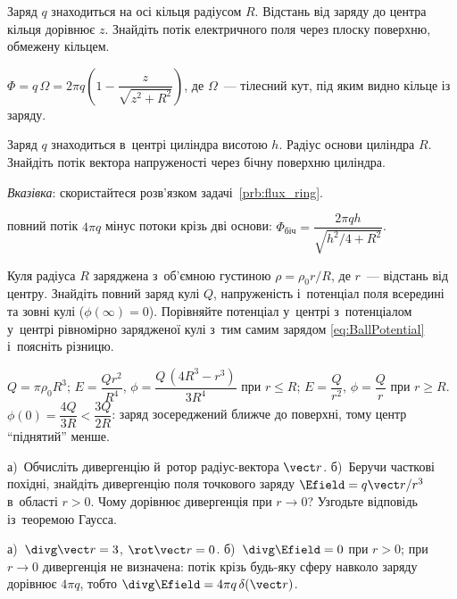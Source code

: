 
\begin{problem}\label{prb:flux_ring}%
	Заряд $q$ знаходиться на осі кільця радіусом $R$. Відстань від заряду до центра кільця
	дорівнює $z$. Знайдіть потік електричного поля через плоску поверхню, обмежену кільцем.
	\begin{solution}
		$\Phi=q\,\Omega=2\pi q\left(1-\dfrac{z}{\sqrt{z^2+R^2}}\right)$, де $\Omega$~--- тілесний кут, під яким видно кільце із заряду.
	\end{solution}
\end{problem}

\begin{problem}%
	Заряд $q$ знаходиться в~центрі циліндра висотою $h$. Радіус основи циліндра $R$.
	Знайдіть потік вектора напруженості через бічну поверхню циліндра.

	\medskip

	\emph{Вказівка}: скористайтеся розв'язком задачі~\ref{prb:flux_ring}.
	\begin{solution}
		повний потік $4\pi q$ мінус потоки крізь дві основи: $\Phi_\text{біч}=\dfrac{2\pi q h}{\sqrt{h^2/4+R^2}}$.
	\end{solution}
\end{problem}

\begin{problem}%
	Куля радіуса $R$ заряджена з~об'ємною густиною $\rho = \rho_0 r/R$, де $r$~---
	відстань від центру. Знайдіть повний заряд кулі $Q$, напруженість і~потенціал поля
	всередині та зовні кулі ($\phi(\infty) = 0$). Порівняйте потенціал у~центрі
	з~потенціалом у~центрі рівномірно зарядженої кулі з~тим самим зарядом
	\eqref{eq:BallPotential} і~поясніть різницю.
	\begin{solution}
		$Q = \pi\rho_0R^3$; $E = \dfrac{Qr^2}{R^4}$, $\phi = \dfrac{Q\,(4R^3 - r^3)}{3R^4}$ при $r\leqslant R$; $E = \dfrac{Q}{r^2}$, $\phi = \dfrac{Q}{r}$ при $r\geqslant R$. $\phi(0) = \dfrac{4Q}{3R} < \dfrac{3Q}{2R}$: заряд зосереджений ближче до поверхні, тому центр \enquote{піднятий} менше.
	\end{solution}
\end{problem}

\begin{problem}%
	а)~Обчисліть дивергенцію й~ротор радіус-вектора $\vect r$. б)~Беручи часткові похідні,
	знайдіть дивергенцію поля точкового заряду $\Efield = q\vect r/r^3$ в~області $r>0$.
	Чому дорівнює дивергенція при $r\to0$? Узгодьте відповідь із~теоремою Гаусса.
	\begin{solution}
		а)~$\divg\vect r=3$, $\rot\vect r=0$. б)~$\divg\Efield=0$ при $r>0$; при $r\to0$ дивергенція не визначена: потік крізь будь-яку сферу навколо заряду дорівнює $4\pi q$, тобто $\divg\Efield=4\pi q\,\delta(\vect r)$.
	\end{solution}
\end{problem}

